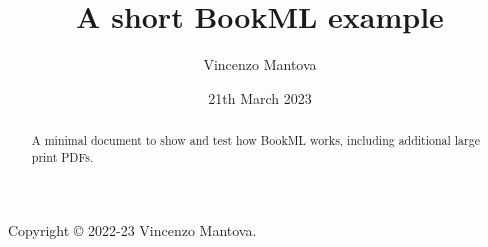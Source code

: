 \documentclass[oneside,11pt]{amsart}
\title{A short BookML example}
\author{Vincenzo Mantova}
\date{21th March 2023}
\begin{document}
\begin{abstract}
  A minimal document to show and test how BookML works, including additional large print PDFs.
\end{abstract}

\maketitle

\begin{lxFooter}
  Copyright \copyright{} 2022-23 Vincenzo Mantova.
\end{lxFooter}


\end{document}

